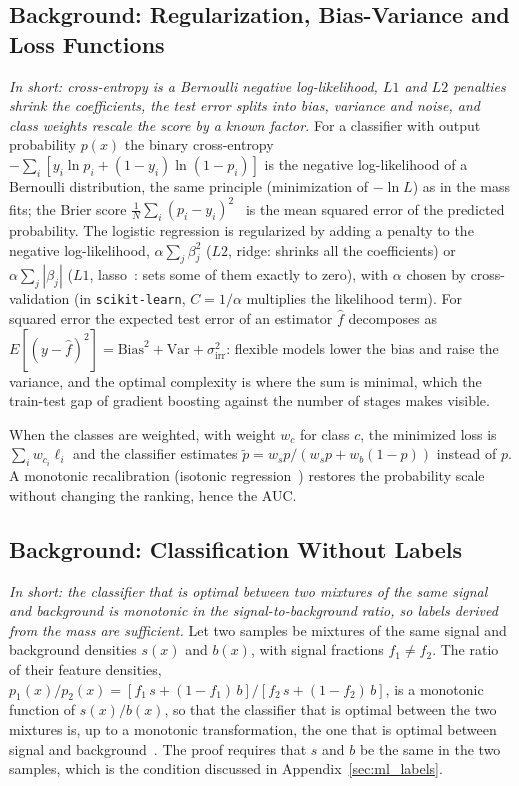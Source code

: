 \subsection{Background: Regularization, Bias-Variance and Loss Functions}
\label{app:theory_ml}
\emph{In short: cross-entropy is a Bernoulli negative log-likelihood, $L1$ and $L2$ penalties shrink the coefficients, the test error splits into bias, variance and noise, and class weights rescale the score by a known factor.}
For a classifier with output probability $p(x)$ the binary cross-entropy $-\sum_i[y_i\ln p_i+(1-y_i)\ln(1-p_i)]$ is the negative log-likelihood of a Bernoulli distribution, the same principle (minimization of $-\ln L$) as in the mass fits; the Brier score $\frac1N\sum_i(p_i-y_i)^2$~\cite{brier} is the mean squared error of the predicted probability. The logistic regression is regularized by adding a penalty to the negative log-likelihood, $\alpha\sum_j\beta_j^2$ ($L2$, ridge: shrinks all the coefficients) or $\alpha\sum_j|\beta_j|$ ($L1$, lasso~\cite{tibshirani_lasso}: sets some of them exactly to zero), with $\alpha$ chosen by cross-validation (in \texttt{scikit-learn}, $C=1/\alpha$ multiplies the likelihood term). For squared error the expected test error of an estimator $\hat f$ decomposes as $E[(y-\hat f)^2]=\mathrm{Bias}^2+\mathrm{Var}+\sigma^2_{\mathrm{irr}}$: flexible models lower the bias and raise the variance, and the optimal complexity is where the sum is minimal, which the train-test gap of gradient boosting against the number of stages makes visible.

When the classes are weighted, with weight $w_c$ for class $c$, the minimized loss is $\sum_iw_{c_i}\ell_i$ and the classifier estimates $\tilde p=w_sp/(w_sp+w_b(1-p))$ instead of $p$. A monotonic recalibration (isotonic regression~\cite{zadrozny_elkan}) restores the probability scale without changing the ranking, hence the AUC.

\subsection{Background: Classification Without Labels}
\emph{In short: the classifier that is optimal between two mixtures of the same signal and background is monotonic in the signal-to-background ratio, so labels derived from the mass are sufficient.}
Let two samples be mixtures of the same signal and background densities $s(x)$ and $b(x)$, with signal fractions $f_1\neq f_2$. The ratio of their feature densities, $p_1(x)/p_2(x)=[f_1\,s+(1-f_1)\,b]/[f_2\,s+(1-f_2)\,b]$, is a monotonic function of $s(x)/b(x)$, so that the classifier that is optimal between the two mixtures is, up to a monotonic transformation, the one that is optimal between signal and background~\cite{cwola}. The proof requires that $s$ and $b$ be the same in the two samples, which is the condition discussed in Appendix~\ref{sec:ml_labels}.

